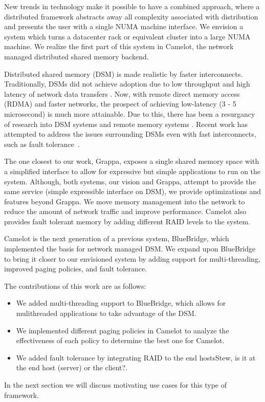 New trends in technology make it possible to have a combined approach, where a
distributed framework abstracts away all complexity associated with distribution
and presents the user with a single NUMA machine interface. We envision a system
which turns a datacenter rack or equivalent cluster into a large NUMA machine.
We realize the first part of this system in Camelot, the network managed
distributed shared memory backend. 

Distributed shared memory (DSM) is made realistic by faster interconnects.
Traditionally, DSMs did not achieve adoption due to low throughput and high
latency of network data transfers . Now, with remote direct memory
access (RDMA) and faster networks, the prospect of achieving low-latency (3 - 5
microsecond) is much more attainable. Due to this, there has been a resurgancy
of research into DSM systems and remote memory systems . Recent work
has attempted to address the issues surrounding DSMs even with fast
interconnects, such as fault tolerance~\cite{Ongaro2011,Nelson2015}.

The one closest to our work, Grappa, exposes a single shared memory space with
a simplified interface to allow for expressive but simple applications to run
on the system. Although, both systems, our vision and Grappa, attempt to provide
the same service (simple expressible interface on DSM), we provide optimizations
and features beyond Grappa. We move memory management into the network to reduce
the amount of network traffic and improve performance. Camelot also provides
fault tolerant memory by adding different RAID levels to the system. 

Camelot is the next generation of a previous system, BlueBridge, which
implemented the basis for network managed DSM. We expand upon BlueBridge to
bring it closer to our envisioned system by adding support for multi-threading,
improved paging policies, and fault tolerance.

The contributions of this work are as follows:
\begin{itemize}
	\item We added multi-threading support to BlueBridge, which allows for
	mulithreaded applications to take advantage of the DSM.
	\item We implemented different paging policies in Camelot to analyze the
	effectiveness of each policy to determine the best one for Camelot.
	\item We added fault tolerance by integrating RAID to the end hosts\ac{Stew,
	is it at the end host (server) or the client?}.
\end{itemize}

In the next section we will discuss motivating use cases for this type of
framework. 
